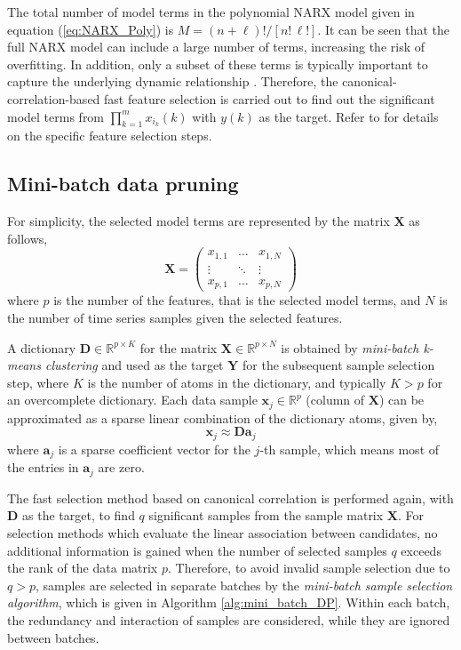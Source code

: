 \documentclass{article}
\begin{document}
The total number of model terms in the polynomial NARX model given in equation (\ref{eq:NARX_Poly}) is $M = (n + \ell)!/[n! \, \ell!]$. 
It can be seen that the full NARX model can include a large number of terms, increasing the risk of overfitting.
In addition, only a subset of these terms is typically important to capture the underlying dynamic relationship \cite{billings2013nonlinear}. %
Therefore, the canonical-correlation-based fast feature selection is carried out to find out the significant model terms from $\prod_{k=1}^{m} x_{i_k}(k)$ with $y(k)$ as the target. Refer to \cite{zhang2025canonical} for details on the specific feature selection steps. 

\subsection{Mini-batch data pruning}
For simplicity, the selected model terms are represented by the matrix $\mathbf{X}$ as follows,
\begin{equation*}
\mathbf{X} = 
\begin{pmatrix}
x_{1,1} & \dots & x_{1,N} \\
\vdots & \ddots & \vdots \\
x_{p,1} & \dots & x_{p,N} 
\end{pmatrix} 
\end{equation*}
where $p$ is the number of the features, that is the selected model terms, and $N$ is the number of time series samples given the selected features.

A dictionary $\mathbf{D} \in \mathbb{R}^{p \times K}$ for the matrix $\mathbf{X} \in \mathbb{R}^{p \times N}$ is obtained by \textit{mini-batch k-means clustering} \cite{sculley2010web} and used as the target $\mathbf{Y}$ for the subsequent sample selection step, where $K$ is the number of atoms in the dictionary, and typically $K > p$ for an overcomplete dictionary.
Each data sample $\mathbf{x}_{j} \in \mathbb{R}^p$ (column of $\mathbf{X}$) can be approximated as a sparse linear combination of the dictionary atoms, given by, 
\begin{equation*}
    \mathbf{x}_j \approx  \mathbf{D}\mathbf{a}_j
\end{equation*}
where $\mathbf{a}_j$ is a sparse coefficient vector for the $j$-th sample, which means most of the entries in $\mathbf{a}_j$  are zero. 

The fast selection method based on canonical correlation is performed again, with $\mathbf{D}$ as the target, to find $q$ significant samples from the sample matrix $\mathbf{X}$. 
For selection methods which evaluate the linear association between candidates, no additional information is gained when the number of selected samples $q$ exceeds the rank of the data matrix $p$.
Therefore, to avoid invalid sample selection due to $q>p$, samples are selected in separate batches by the \textit{mini-batch sample selection algorithm}, which is given in Algorithm \ref{alg:mini_batch_DP}.
Within each batch, the redundancy and interaction of samples are considered, while they are ignored between batches.
\end{document}
